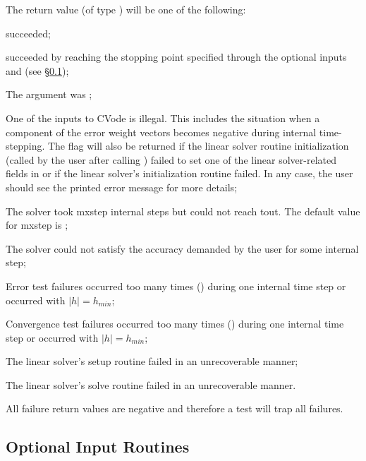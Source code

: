 {
The return value  (of type ) will be one of the following:
\begin{args}
\item[\Id{SUCCESS}]
   succeeded;
\item[\Id{TSTOP\_RETURN}]
   succeeded by reaching the stopping point specified through
  the optional inputs  and  
  (see \S\ref{sss:optional_io});
\item[\Id{CVODE\_NO\_MEM}]
  The  argument was ;
\item[\Id{ILL\_INPUT}]
  One of the inputs to CVode is illegal. This includes the situation when a 
  component of the error weight vectors becomes negative during internal 
  time-stepping. The  flag will also be returned if the linear 
  solver routine initialization (called by the user after calling 
  ) failed to set one of the linear solver-related fields 
  in  or if the linear solver's initialization routine failed. 
  In any case, the user should see the printed error message for more details;
\item[\Id{TOO\_MUCH\_WORK}] 
  The solver took mxstep internal steps but could not reach tout. 
  The default value for mxstep is ;      
\item[\Id{TOO\_MUCH\_ACC}] 
  The solver could not satisfy the accuracy demanded by the user for some 
  internal step;
\item[\Id{ERR\_FAILURE}]
  Error test failures occurred too many times () during one 
  internal time step or occurred with $|h| = h_{min}$;
\item[\Id{CONV\_FAILURE}] 
  Convergence test failures occurred too many times () during 
  one internal time step or occurred with $|h| = h_{min}$;             
\item[\Id{SETUP\_FAILURE}] 
  The linear solver's setup routine failed in an unrecoverable manner;
\item[\Id{SOLVE\_FAILURE}] 
  The linear solver's solve routine failed in an unrecoverable manner.
\end{args} 
All failure return values are negative and therefore a test 
will trap all  failures.
}
{}

\subsection{Optional Input Routines}\label{sss:optional_io}

